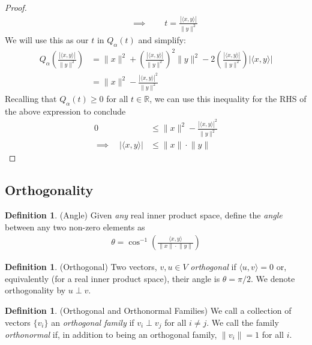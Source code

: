 \documentclass[12pt]{article}
\numberwithin{equation}{section} %
\theoremstyle{plain}
\theoremstyle{definition}
\newtheorem{defn}[thm]{Definition}
\theoremstyle{remark}
\newcommand{\R}{\mathbb{R}}
\begin{document}
\begin{proof}
\begin{align*}
  \qquad\implies\qquad
  t = \frac{|\langle x,y\rangle|}{\lVert y\rVert^2}
\end{align*}
We will use this as our $t$ in $Q_\alpha(t)$ and simplify:
\begin{align*}
  Q_\alpha\left(
  \frac{|\langle x,y\rangle|}{\lVert y\rVert^2}
  \right)
  &= \lVert x\rVert^2 +
  \left(\frac{|\langle x,y\rangle|}{\lVert y\rVert^2}\right)^2
  \lVert y\rVert^2
  -2
  \left(\frac{|\langle x,y\rangle|}{\lVert y\rVert^2}\right)
  |\langle x,y\rangle| \\
  &= \lVert x\rVert^2
  - \frac{|\langle x,y\rangle|^2}{\lVert y\rVert^2}
\end{align*}
Recalling that $Q_\alpha(t)\geq 0$ for all $t\in\R$, we can use this
inequality for the RHS of the above expression to conclude
\begin{align*}
  0 &\leq
   \lVert x\rVert^2
  - \frac{|\langle x,y\rangle|^2}{\lVert y\rVert^2} \\
  \implies\quad
  |\langle x,y\rangle| &\leq
   \lVert x\rVert \cdot \lVert y\rVert
\end{align*}
\end{proof}



\clearpage
\subsection{Orthogonality}

\begin{defn}(Angle)
Given \emph{any} real inner product space, define the \emph{angle}
between any two non-zero elements as
\begin{align*}
  \theta = \cos^{-1}\left(
  \frac{\langle x,y \rangle}{\lVert x\rVert \cdot \lVert y \rVert}
  \right)
\end{align*}
\end{defn}

\begin{defn}(Orthogonal)
Two vectors, $v,u\in V$ \emph{orthogonal} if $\langle u,v\rangle=0$ or,
equivalently (for a real inner product space), their angle is
$\theta=\pi/2$. We denote orthogonality by $u\perp v$.
\end{defn}

\begin{defn}(Orthogonal and Orthonormal Families)
We call a collection of vectors $\{v_i\}$ an \emph{orthogonal family} if
$v_i\perp v_j$ for all $i\neq j$. We call the family \emph{orthonormal}
if, in addition to being an orthogonal family, $\lVert v_i\rVert=1$ for
all $i$.
\end{defn}
\end{document}
